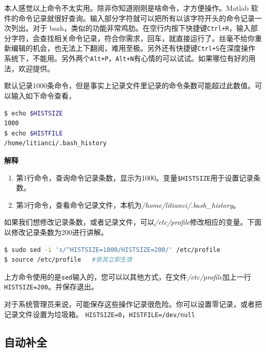 \documentclass[doctor,openright,twoside]{sjtuthesis}
\providecommand{\tightlist}{%
    \setlength{\itemsep}{0pt}\setlength{\parskip}{0pt}}
\newcommand{\passthrough}[1]{#1}
\theoremstyle{plain}
\theoremstyle{definition}
\theoremstyle{remark}
\theoremstyle{ocrenumbox}
\theoremstyle{plain}
\let\BeginKnitrBlock\begin \let\EndKnitrBlock\end
\begin{document}
本人感觉以上命令不太实用。除非你知道刚刚是啥命令，才方便操作。Matlab
软件的命令记录就很好查询。输入部分字符就可以把所有以该字符开头的命令记录一次列出。对于
bash，类似的功能非常鸡肋。在空行内按下快捷键\passthrough{\lstinline!Ctrl+R!}，输入部分字符，会查找相关命令记录，符合你需求，回车，就直接运行了。丝毫不给你重新编辑的机会，也无法上下翻阅，难用至极。另外还有快捷键\passthrough{\lstinline!Ctrl+S!}在深度操作系统下，不能用。另外两个\passthrough{\lstinline!Alt+P!}，\passthrough{\lstinline!Alt+N!}有心情的可以试试。如果哪位有好的用法，欢迎提供。

默认记录1000条命令，但是事实上记录文件里记录的命令条数可能超过此数值。可以输入如下命令查看，

\begin{lstlisting}[language=bash]
$ echo $HISTSIZE
1000
$ echo $HISTFILE
/home/litianci/.bash_history
\end{lstlisting}

\textbf{解释}

\begin{enumerate}
\def\labelenumi{\arabic{enumi}.}
\tightlist
\item
  第1行命令，查询命令记录条数，显示为1000。变量\passthrough{\lstinline!$HISTSIZE!}用于设置记录条数。
\item
  第3行命令，查看命令记录文件，本机为\emph{/home/litianci/.bash\_history}。
\end{enumerate}

如果我们想修改记录条数，或者记录文件，可以\emph{/etc/profile}修改相应的变量。下面以修改记录条数为200进行讲解。

\begin{lstlisting}[language=bash]
$ sudo sed -i 's/^HISTSIZE=1000/HISTSIZE=200/' /etc/profile
$ source /etc/profile   #使其立即生效
\end{lstlisting}

上方命令使用的是\passthrough{\lstinline!sed!}输入的，您可以以其他方式，在文件\emph{/etc/profile}加上一行\passthrough{\lstinline!HISTSIZE=200!}。并保存退出。

\BeginKnitrBlock{rmdcaution}
对于系统管理员来说，可能保存这些操作记录很危险。你可以设置零记录，或者把记录文件设置为垃圾箱。
\passthrough{\lstinline!HISTSIZE=0!}，\passthrough{\lstinline!HISTFILE=/dev/null!}
\EndKnitrBlock{rmdcaution}

\subsection{自动补全}
\end{document}
